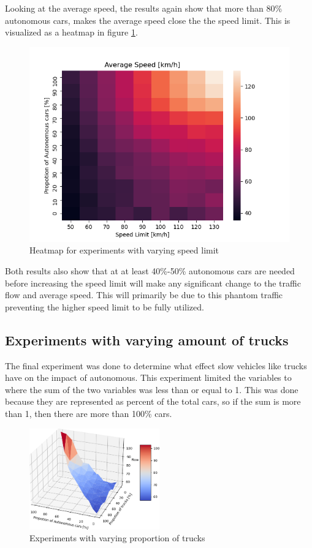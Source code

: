 Looking at the average speed, the results again show that more than 80\% autonomous cars, makes the average speed close the the speed limit. This is visualized as a heatmap in figure \ref{fig:experiment3heatmap}. 
\begin{figure}[H]
    \centering
    \includegraphics[width=\linewidth]{images/Experiment3-Speed.png}
    \caption{Heatmap for experiments with varying speed limit}
    \label{fig:experiment3heatmap}
\end{figure}
Both results also show that at at least 40\%-50\% autonomous cars are needed before increasing the speed limit will make any significant change to the traffic flow and average speed. This will primarily be due to this phantom traffic preventing the higher speed limit to be fully utilized.


\subsection{Experiments with varying amount of trucks}
The final experiment was done to determine what effect slow vehicles like trucks have on the impact of autonomous. This experiment limited the variables to where the sum of the two variables was less than or equal to 1. This was done because they are represented as percent of the total cars, so if the sum is more than 1, then there are more than 100\% cars.

\begin{figure}[H]
    \centering
    \includegraphics[width=0.5\textwidth]{images/Experiment4.png}
    \caption{Experiments with varying proportion of trucks}
    \label{fig:experiment4}
\end{figure}


